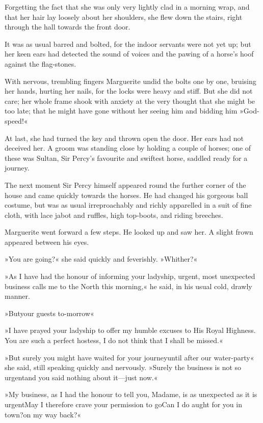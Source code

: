 Forgetting the fact that she was only very lightly clad in a morning wrap, and that her hair lay loosely about her shoulders, she flew down the stairs, right through the hall towards the front door.

It was as usual barred and bolted, for the indoor servants were not yet up; but her keen ears had detected the sound of voices and the pawing of a horse's hoof against the flag-stones.

With nervous, trembling fingers Marguerite undid the bolts one by one, bruising her hands, hurting her nails, for the locks were heavy and stiff. But she did not care; her whole frame shook with anxiety at the very thought that she might be too late; that he might have gone without her seeing him and bidding him »God-speed!«

At last, she had turned the key and thrown open the door. Her ears had not deceived her. A groom was standing close by holding a couple of horses; one of these was Sultan, Sir Percy's favourite and swiftest horse, saddled ready for a journey.

The next moment Sir Percy himself appeared round the further corner of the house and came quickly towards the horses. He had changed his gorgeous ball costume, but was as usual irreproachably and richly apparelled in a suit of fine cloth, with lace jabot and ruffles, high top-boots, and riding breeches.

Marguerite went forward a few steps. He looked up and saw her. A slight frown appeared between his eyes.

»You are going?« she said quickly and feverishly. »Whither?«

»As I have had the honour of informing your ladyship, urgent, most unexpected business calls me to the North this morning,« he said, in his usual cold, drawly manner.

»But\textellipsis \allowbreak  your guests to-morrow\textellipsis«

»I have prayed your ladyship to offer my humble excuses to His Royal Highness. You are such a perfect hostess, I do not think that I shall be missed.«

»But surely you might have waited for your journey\textellipsis \allowbreak  until after our water-party\textellipsis« she said, still speaking quickly and nervously. »Surely the business is not so urgent\textellipsis \allowbreak  and you said nothing about it—just now.«

»My business, as I had the honour to tell you, Madame, is as unexpected as it is urgent\textellipsis \allowbreak  May I therefore crave your permission to go\textellipsis \allowbreak  Can I do aught for you in town?\textellipsis \allowbreak  on my way back?«

